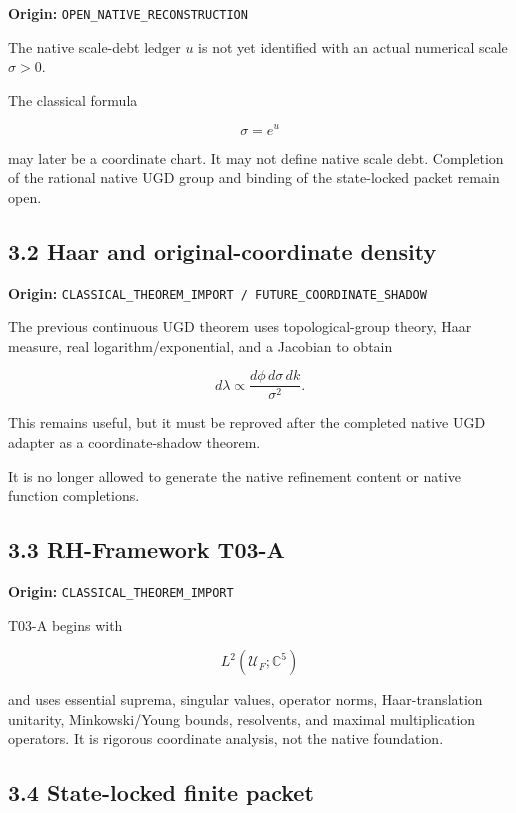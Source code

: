 \textbf{Origin:} \texttt{OPEN\_NATIVE\_RECONSTRUCTION}

The native scale-debt ledger \(u\) is not yet identified with an actual
numerical scale \(\sigma>0\).

The classical formula

\[
\sigma=e^u
\]

may later be a coordinate chart. It may not define native scale debt. Completion
of the rational native UGD group and binding of the state-locked packet remain
open.

\hypertarget{haar-and-original-coordinate-density}{%
\subsection{3.2 Haar and original-coordinate density}\label{haar-and-original-coordinate-density}}

\textbf{Origin:} \texttt{CLASSICAL\_THEOREM\_IMPORT\ /\ FUTURE\_COORDINATE\_SHADOW}

The previous continuous UGD theorem uses topological-group theory, Haar measure,
real logarithm/exponential, and a Jacobian to obtain

\[
d\lambda
\propto
\frac{d\phi\,d\sigma\,dk}{\sigma^2}.
\]

This remains useful, but it must be reproved after the completed native UGD
adapter as a coordinate-shadow theorem.

It is no longer allowed to generate the native refinement content or native
function completions.

\hypertarget{rh-framework-t03-a}{%
\subsection{3.3 RH-Framework T03-A}\label{rh-framework-t03-a}}

\textbf{Origin:} \texttt{CLASSICAL\_THEOREM\_IMPORT}

T03-A begins with

\[
L^2(\mathcal U_F;\mathbb C^5)
\]

and uses essential suprema, singular values, operator norms, Haar-translation
unitarity, Minkowski/Young bounds, resolvents, and maximal multiplication
operators. It is rigorous coordinate analysis, not the native foundation.

\hypertarget{state-locked-finite-packet}{%
\subsection{3.4 State-locked finite packet}\label{state-locked-finite-packet}}

